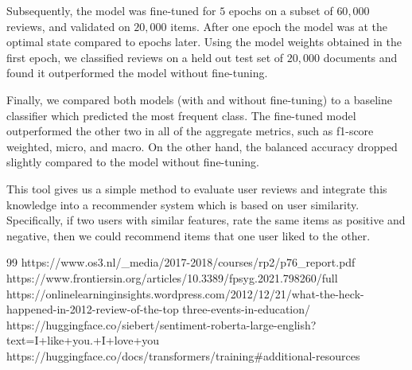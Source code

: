 \documentclass[a4paper,10pt, openright]{article}
\begin{document}
Subsequently, the model was fine-tuned for $5$ epochs on a subset of $60,000$ reviews, and validated on $20,000$ items. After one epoch the model was at the optimal state compared to epochs later. Using the model weights obtained in the first epoch, we classified reviews on a held out test set of $20,000$ documents and found it outperformed the model without fine-tuning. 

Finally, we compared both models (with and without fine-tuning) to a baseline classifier which predicted the most frequent class. The fine-tuned model outperformed the other two in all of the aggregate metrics, such as f1-score weighted, micro, and macro. On the other hand, the balanced accuracy dropped slightly compared to the model without fine-tuning. 

This tool gives us a simple method to evaluate user reviews and integrate this knowledge into a recommender system which is based on user similarity. Specifically, if two users with similar features, rate the same items as positive and negative, then we could recommend items that one user liked to the other.

\newpage
\begin{thebibliography} {99}
	 https://www.os3.nl/\_media/2017-2018/courses/rp2/p76\_report.pdf
	 https://www.frontiersin.org/articles/10.3389/fpsyg.2021.798260/full
		https://onlinelearninginsights.wordpress.com/2012/12/21/what-the-heck-happened-in-2012-review-of-the-top three-events-in-education/
	 https://huggingface.co/siebert/sentiment-roberta-large-english?text=I+like+you.+I+love+you
		https://huggingface.co/docs/transformers/training\#additional-resources
	
\end{thebibliography}
\end{document}

